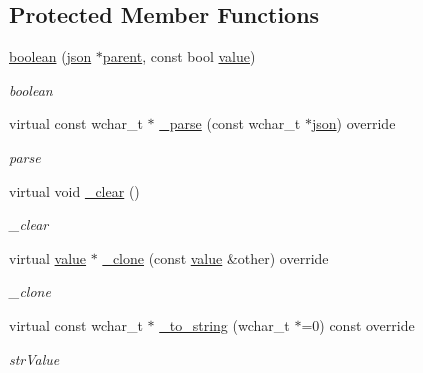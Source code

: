 \subsection*{Protected Member Functions}
\begin{DoxyCompactItemize}
\item 
\hyperlink{classformat_1_1boolean_a7613c19f7e09d9bc1abd67003883e3a7}{boolean} (\hyperlink{classformat_1_1json}{json} $\ast$\hyperlink{classformat_1_1value_a86c03ec8810bfd0d60ec49095120040d}{parent}, const bool \hyperlink{classformat_1_1value_aa6b85823936bf7b8ab78d3f8d443c00d}{value})
\begin{DoxyCompactList}\small\item\em boolean \end{DoxyCompactList}\item 
virtual const wchar\+\_\+t $\ast$ \hyperlink{classformat_1_1boolean_a6c3d3fc4e0a046f2070c5513ce61b12b}{\+\_\+parse} (const wchar\+\_\+t $\ast$\hyperlink{classformat_1_1json}{json}) override
\begin{DoxyCompactList}\small\item\em parse \end{DoxyCompactList}\item 
virtual void \hyperlink{classformat_1_1boolean_ab72d7e3749eaaaa8367150f816792ae2}{\+\_\+clear} ()\hypertarget{classformat_1_1boolean_ab72d7e3749eaaaa8367150f816792ae2}{}\label{classformat_1_1boolean_ab72d7e3749eaaaa8367150f816792ae2}

\begin{DoxyCompactList}\small\item\em \+\_\+clear \end{DoxyCompactList}\item 
virtual \hyperlink{classformat_1_1value_aa6b85823936bf7b8ab78d3f8d443c00d}{value} $\ast$ \hyperlink{classformat_1_1boolean_aa736f994233dad5fa8fcef030e50e2d7}{\+\_\+clone} (const \hyperlink{classformat_1_1value_aa6b85823936bf7b8ab78d3f8d443c00d}{value} \&other) override
\begin{DoxyCompactList}\small\item\em \+\_\+clone \end{DoxyCompactList}\item 
virtual const wchar\+\_\+t $\ast$ \hyperlink{classformat_1_1boolean_a8ca18cfd6036fe8d0255b08c91eb3e30}{\+\_\+to\+\_\+string} (wchar\+\_\+t $\ast$=0) const override
\begin{DoxyCompactList}\small\item\em str\+Value \end{DoxyCompactList}\end{DoxyCompactItemize}

